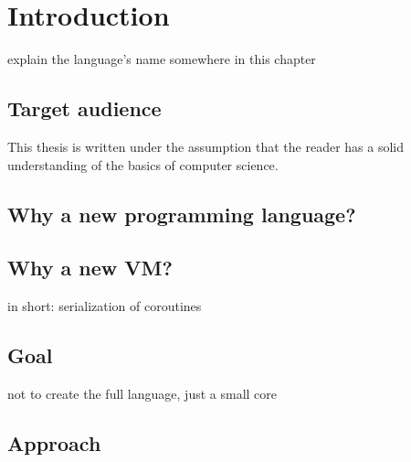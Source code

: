 
\chapter{Introduction} %

explain the language's name somewhere in this chapter

    \section{Target audience}
    This thesis is written under the assumption that the reader has a solid understanding of the basics of computer science.
    
    
    \section{Why a new programming language?}
    
    \section{Why a new VM?}
    
    in short: serialization of coroutines
    
    
    \section{Goal} %
    
    not to create the full language, just a small core
    
    
    
    \section{Approach} %
